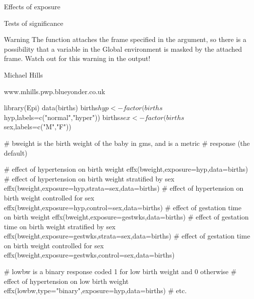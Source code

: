 \begin{Value}
\begin{ldescription}
\item[\code{comp1 }] Effects of exposure
\item[\code{comp2 }] Tests of significance
\end{ldescription}
\end{Value}
\begin{Section}{Warning}
The function attaches the frame specified in the
 argument, so there is a possibility that a variable in the
Global environment is masked by the attached frame. Watch out for this
warning in the output!
\end{Section}
\begin{Author}\relax
Michael Hills
\end{Author}
\begin{References}\relax
www.mhills.pwp.blueyonder.co.uk
\end{References}
\begin{Examples}
\begin{ExampleCode}
library(Epi)
data(births)
births$hyp <- factor(births$hyp,labels=c("normal","hyper"))
births$sex <- factor(births$sex,labels=c("M","F"))

# bweight is the birth weight of the baby in gms, and is a metric
# response (the default) 

# effect of hypertension on birth weight
effx(bweight,exposure=hyp,data=births) 
# effect of hypertension on birth weight stratified by sex
effx(bweight,exposure=hyp,strata=sex,data=births) 
# effect of hypertension on birth weight controlled for sex
effx(bweight,exposure=hyp,control=sex,data=births) 
# effect of gestation time on birth weight
effx(bweight,exposure=gestwks,data=births) 
# effect of gestation time on birth weight stratified by sex
effx(bweight,exposure=gestwks,strata=sex,data=births) 
# effect of gestation time on birth weight controlled for sex
effx(bweight,exposure=gestwks,control=sex,data=births) 

# lowbw is a binary response coded 1 for low birth weight and 0 otherwise
# effect of hypertension on low birth weight
effx(lowbw,type="binary",exposure=hyp,data=births)
# etc.
\end{ExampleCode}
\end{Examples}

